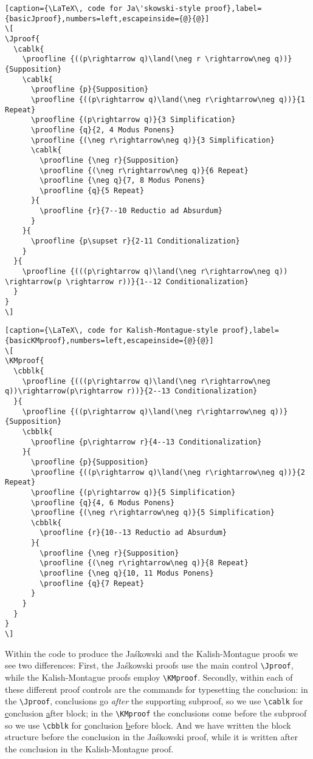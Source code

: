 \documentclass[11pt]{article}
\newcommand{\Jas}{Ja\'skowski }
\begin{document}
\begin{lstlisting}[caption={\LaTeX\, code for Ja\'skowski-style proof},label={basicJproof},numbers=left,escapeinside={@}{@}]
\[
\Jproof{
  \cablk{
    \proofline {((p\rightarrow q)\land(\neg r \rightarrow\neg q))}{Supposition}
    \cablk{
      \proofline {p}{Supposition}
      \proofline {((p\rightarrow q)\land(\neg r\rightarrow\neg q))}{1 Repeat}
      \proofline {(p\rightarrow q)}{3 Simplification}
      \proofline {q}{2, 4 Modus Ponens}
      \proofline {(\neg r\rightarrow\neg q)}{3 Simplification}
      \cablk{
        \proofline {\neg r}{Supposition}
        \proofline {(\neg r\rightarrow\neg q)}{6 Repeat}
        \proofline {\neg q}{7, 8 Modus Ponens}
        \proofline {q}{5 Repeat}
      }{
        \proofline {r}{7--10 Reductio ad Absurdum}  
      }
    }{
      \proofline {p\supset r}{2-11 Conditionalization}
    }
  }{
    \proofline {(((p\rightarrow q)\land(\neg r\rightarrow\neg q)) \rightarrow(p \rightarrow r))}{1--12 Conditionalization}
  }
}
\]
\end{lstlisting}

\begin{lstlisting}[caption={\LaTeX\, code for Kalish-Montague-style proof},label={basicKMproof},numbers=left,escapeinside={@}{@}]
\[
\KMproof{
  \cbblk{  
  	\proofline {(((p\rightarrow q)\land(\neg r\rightarrow\neg q))\rightarrow(p\rightarrow r))}{2--13 Conditionalization}
  }{
    \proofline {((p\rightarrow q)\land(\neg r\rightarrow\neg q))}{Supposition}   
    \cbblk{
      \proofline {p\rightarrow r}{4--13 Conditionalization}
    }{
      \proofline {p}{Supposition}
      \proofline {((p\rightarrow q)\land(\neg r\rightarrow\neg q))}{2 Repeat}
      \proofline {(p\rightarrow q)}{5 Simplification}
      \proofline {q}{4, 6 Modus Ponens}
      \proofline {(\neg r\rightarrow\neg q)}{5 Simplification}
      \cbblk{
        \proofline {r}{10--13 Reductio ad Absurdum}
      }{   
        \proofline {\neg r}{Supposition}    
        \proofline {(\neg r\rightarrow\neg q)}{8 Repeat}
        \proofline {\neg q}{10, 11 Modus Ponens}
        \proofline {q}{7 Repeat}
      }
    }
  }
}
\]
\end{lstlisting}

\normalsize
\medskip

\noindent Within the code to produce the \Jas and the Kalish-Montague proofs we see two differences:  First, the \Jas proofs use the main control \verb+\Jproof+, while the Kalish-Montague proofs employ \verb+\KMproof+.  Secondly, within each of these different proof controls are the commands for typesetting the conclusion: in the \verb+\Jproof+, conclusions go \emph{after} the supporting subproof, so we use \verb+\cablk+ for \uline{c}onclusion \uline{a}fter block; in the \verb+\KMproof+ the conclusions come before the subproof so we use \verb+\cbblk+ for \uline{c}onclusion \uline{b}efore block.  And we have written the block structure before the conclusion in the \Jas proof, while it is written after the conclusion in the Kalish-Montague proof.
\end{document}
